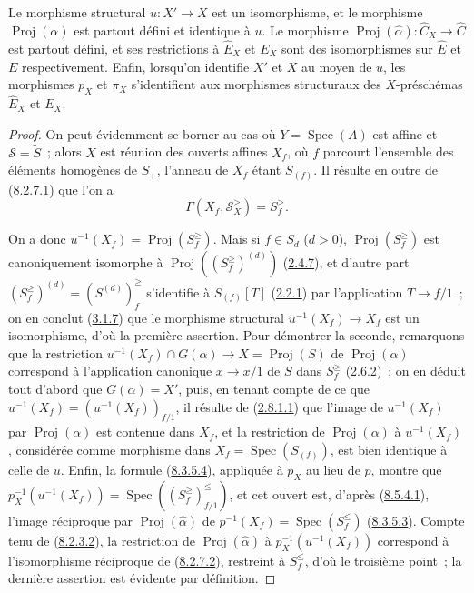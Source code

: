 \begin{proposition}[8.6.2]
\label{II.8.6.2-fr}
Le morphisme structural $u:X'\to X$ est un isomorphisme, et le morphisme
$\operatorname{Proj}(\alpha)$ est partout défini et identique à $u$. Le
morphisme
$\operatorname{Proj}(\widehat{\alpha}):\widehat{C}_X\to\widehat{C}$ est
partout défini, et ses restrictions à $\widehat{E}_X$ et $E_X$ sont des
isomorphismes sur $\widehat{E}$ et $E$ respectivement. Enfin, lorsqu'on
identifie $X'$ et $X$ au moyen de $u$, les morphismes $p_X$ et $\pi_X$
s'identifient aux morphismes structuraux des $X$-préschémas $\widehat{E}_X$ et
$E_X$.
\end{proposition}

\begin{proof}
On peut évidemment se borner au cas où $Y=\operatorname{Spec}(A)$ est affine
et $\mathcal{S}=\widetilde{S}$~; alors $X$ est réunion des ouverts affines
$X_f$, où $f$ parcourt l'ensemble des éléments homogènes de $S_+$, l'anneau
de $X_f$ étant $S_{(f)}$. Il résulte en outre de
(\hyperref[II.8.2.7.1-fr]{8.2.7.1}) que l'on a
\begin{equation}
\label{II.8.6.2.1-fr}
  \Gamma(X_f,\mathcal{S}_X^{\geq})=S_f^{\geq}.
\tag{8.6.2.1}
\end{equation}

On a donc $u^{-1}(X_f)=\operatorname{Proj}(S_f^{\geq})$. Mais si
$f\in S_d$ ($d>0$), $\operatorname{Proj}(S_f^{\geq})$ est canoniquement
isomorphe à $\operatorname{Proj}((S_f^{\geq})^{(d)})$
(\hyperref[II.2.4.7-fr]{2.4.7}), et d'autre part
$(S_f^{\geq})^{(d)}=(S^{(d)})_f^{\geq}$ s'identifie à $S_{(f)}[T]$
(\hyperref[II.2.2.1-fr]{2.2.1}) par l'application $T\to f/1$~; on en conclut
(\hyperref[II.3.1.7-fr]{3.1.7}) que le morphisme structural
$u^{-1}(X_f)\to X_f$ est un isomorphisme, d'où la première assertion. Pour
démontrer la seconde, remarquons que la restriction
$u^{-1}(X_f)\cap G(\alpha)\to X=\operatorname{Proj}(S)$ de
$\operatorname{Proj}(\alpha)$ correspond à l'application canonique
$x\to x/1$ de $S$ dans $S_f^{\geq}$
(\hyperref[II.2.6.2-fr]{2.6.2})~; on en déduit tout d'abord que
$G(\alpha)=X'$, puis, en tenant compte de ce que
$u^{-1}(X_f)=(u^{-1}(X_f))_{f/1}$, il résulte de
(\hyperref[II.2.8.1.1-fr]{2.8.1.1}) que l'image de $u^{-1}(X_f)$ par
$\operatorname{Proj}(\alpha)$ est contenue dans $X_f$, et la restriction de
$\operatorname{Proj}(\alpha)$ à $u^{-1}(X_f)$, considérée comme morphisme
dans $X_f=\operatorname{Spec}(S_{(f)})$, est bien identique à celle de $u$.
Enfin, la formule (\hyperref[II.8.3.5.4-fr]{8.3.5.4}), appliquée à $p_X$ au
lieu de $p$, montre que
$p_X^{-1}(u^{-1}(X_f))=
\operatorname{Spec}((S_f^{\geq})_{f/1}^{\leq})$, et cet ouvert est, d'après
(\hyperref[II.8.5.4.1-fr]{8.5.4.1}), l'image réciproque par
$\operatorname{Proj}(\widehat{\alpha})$ de
$p^{-1}(X_f)=\operatorname{Spec}(S_f^{\leq})$
(\hyperref[II.8.3.5.3-fr]{8.3.5.3}). Compte tenu de
(\hyperref[II.8.2.3.2-fr]{8.2.3.2}), la restriction de
$\operatorname{Proj}(\widehat{\alpha})$ à
$p_X^{-1}(u^{-1}(X_f))$ correspond à l'isomorphisme réciproque de
(\hyperref[II.8.2.7.2-fr]{8.2.7.2}), restreint à $S_f^{\leq}$, d'où le
troisième point~; la dernière assertion est évidente par définition.


\end{proof}

